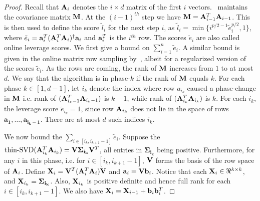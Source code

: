 \begin{proof}{\label{proof:onlineSummationBound}}
Recall that $\mathbf{A}_i$ denotes the $i\times d$ matrix of the first $i$ vectors. \online~maintains the covariance matrix $\mathbf{M}$. At the $(i-1)^{th}$ step we have $\mathbf{M} = \mathbf{A}_{i-1}^T\mathbf{A}_{i-1}$. This is then used to define the score $\tilde{l}_{i}$  for the next step $i$, as $\tilde{l}_i = \min\{i^{p/2-1}\tilde{e}_{i}^{p/2},1\}$, where $\tilde{e}_i = \mathbf{a}_{i}^T (\mathbf{A}_{i}^T \mathbf{A}_{i})^{\dagger} \mathbf{a}_{i}$ and $\mathbf{a}_{i}^{T}$ is the $i^{th}$ row. 
The scores $\tilde{e}_{i}$ are also called online leverage scores. We first give a bound on $\sum_{i=1}^{n} \tilde{e}_{i}$. A similar bound is given in the online matrix row sampling by~\cite{cohen2016online}, albeit for a regularized version of the scores $\tilde{e}_i$. 
As the rows are coming, the rank of $\mathbf{M}$ increases 
from $1$ to at most $d$. We say that the algorithm is
in phase-$k$ if the rank of $\mathbf{M}$ equals $k$. For each phase $k \in [1, d-1]$, let $i_k$ denote the index
where row $a_{i_k}$ caused a phase-change in $\mathbf{M}$ i.e. 
rank of $(\mathbf{A}_{i_k-1}^{T} \mathbf{A}_{i_k-1})$ is $k-1$, while rank of $(\mathbf{A}_{i_k}^{T} \mathbf{A}_{i_k})$ is $k$. 
For each $i_k$, the leverage score $\tilde{e}_{i_k} = 1$, since row $\mathbf{A}_{i_k}$
does not lie in the space of rows $\mathbf{a_1},\ldots, \mathbf{a_{i_k - 1}}$. There
are at most $d$ such indices $i_k$.

We now bound the $\sum_{i\in [i_k, i_{k+1}-1]} \tilde{e}_i$. Suppose the $\mbox{thin-SVD}(\mathbf{A}_{i_k}^T \mathbf{A}_{i_k})=\mathbf{V}\mathbf{\Sigma_{i_k}} \mathbf{V}^T$, all entries in $\mathbf{\Sigma_{i_k}}$ being positive. 
Furthermore, for any $i$ in this phase, i.e. for $i\in [i_{k}, i_{k+1}-1]$, $\mathbf{V}$ forms the basis of the row space of $\mathbf{A}_{i}$. Define
$\mathbf{X}_{i} = \mathbf{V}^T (\mathbf{A}_{i}^T \mathbf{A}_{i}) \mathbf{V}$ and $\mathbf{a}_{i} = \mathbf{V} \mathbf{b}_{i}$. Notice that each $\mathbf{X}_{i}\in \Re^{k\times k}$, and $\mathbf{X}_{i_k} = \mathbf{\Sigma_{i_k}}$. Also, $\mathbf{X}_{i_k}$ is positive definite and hence full rank for each $i\in [i_{k}, i_{k+1}-1]$. We also have $\mathbf{X}_{i} = \mathbf{X}_{i-1} + \mathbf{b}_{i} \mathbf{b}_{i}^T$.


\end{proof}
